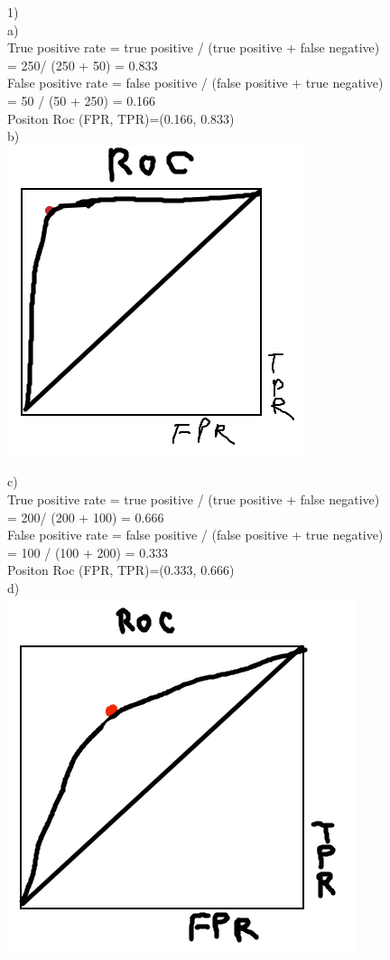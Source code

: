 \documentclass[11pt]{article}
\begin{document}
1) \\
a) \\
True positive rate = true positive / (true positive + false negative) \\
=  250/ (250 + 50) = 0.833 \\
False positive rate = false positive / (false positive + true negative) \\
= 50 / (50 + 250) = 0.166 \\
Positon Roc (FPR, TPR)=(0.166, 0.833) \\

b) \\
\includegraphics[scale=0.45]{roc}

c) \\
True positive rate = true positive / (true positive + false negative) \\
=  200/ (200 + 100) = 0.666 \\
False positive rate = false positive / (false positive + true negative) \\
= 100 / (100 + 200) = 0.333 \\
Positon Roc (FPR, TPR)=(0.333, 0.666) \\

d) \\
\includegraphics[scale=0.45]{roc2}
\end{document}
